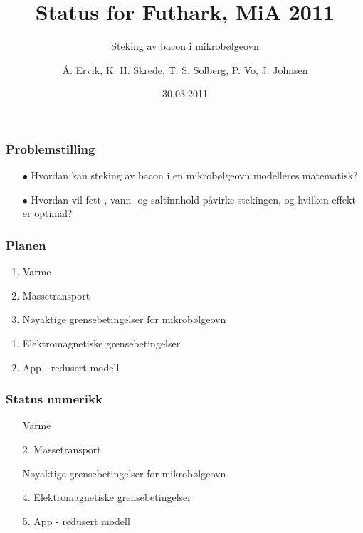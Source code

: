 \documentclass[screen]{beamer}
\title[Status bacon]{Status for Futhark, MiA 2011}
\subtitle{Steking av bacon i mikrobølgeovn}
\author[Futhark]{Å. Ervik, K. H. Skrede, T. S. Solberg, P. Vo, J. Johnsen}
\institute[NTNU]{Eksperter i Team, NTNU}
\date{30.03.2011}
\newcounter{saveenumi}
\newcommand{\checktick}{\textcolor{green}{\checked}}
\begin{document}
\ntnutitlepage

\begin{frame}
  \frametitle{Problemstilling}
  \begin{center}
  \begin{itemize}  
  \item[$\bullet$] Hvordan kan steking av bacon i en mikrobølgeovn modelleres matematisk? 
  \item[$\bullet$] Hvordan vil fett-, vann- og saltinnhold påvirke stekingen, og hvilken effekt er optimal? 
  \end{itemize}
  \end{center}
\end{frame}

\begin{frame}
  \frametitle{Planen}
  \begin{enumerate}
  \item Varme
  \item Massetransport
  \item Nøyaktige grensebetingelser for mikrobølgeovn
    \setcounter{saveenumi}{\theenumi}
\end{enumerate}
    \hline
\begin{enumerate}
    \setcounter{enumi}{\thesaveenumi}
  \item Elektromagnetiske grensebetingelser
  \item App - redusert modell
  \end{enumerate}
\end{frame}

\begin{frame}
  \frametitle{Status numerikk}
  \begin{enumerate}
  \item[\checktick] Varme
  \item[2.] Massetransport
  \item[\checktick] Nøyaktige grensebetingelser for mikrobølgeovn
\end{enumerate}
    \hline
\begin{enumerate}
  \item[4.] Elektromagnetiske grensebetingelser
  \item[5.] App - redusert modell
  \end{enumerate}
\end{frame}
\end{document}
